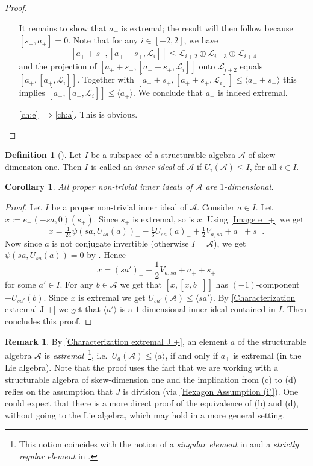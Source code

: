 \documentclass[oneside,a4paper]{amsart} %
\newtheorem{corollary}[theorem]{Corollary}
\theoremstyle{definition}
\newtheorem{remark}[theorem]{Remark}
\newtheorem{definition}[theorem]{Definition}
\newcommand{\A}{\mathcal{A}}
\newcommand{\LL}{\mathcal{L}}
\numberwithin{equation}{section}
\begin{document}
\begin{proof}
\begin{itemize}
    	It remains to show that $a_+$ is extremal; the result will then follow because $[s_+,a_+]=0$.
    	Note that for any $i \in [-2, 2]$, we have
    	\[ [a_++s_+,[a_++s_+,\LL_i]]\leq \LL_{i+2}\oplus \LL_{i+3}\oplus \LL_{i+4} \]
    	and the projection of $[a_++s_+,[a_++s_+,\LL_i]]$ onto  $\LL_{i+2}$ equals $[a_+,[a_+,\LL_i]]$. 
    	Together with $[a_++s_+,[a_++s_+,\LL_i]]\leq \langle a_++s_+\rangle$ this implies $[a_+,[a_+,\LL_i]]\leq \langle a_+\rangle$. 
    	We conclude that $a_+$ is indeed extremal.
    	
	\item[\cref{ch:e}$\implies$\cref{ch:a}.]
    	This is obvious.
	\qedhere
	\end{itemize}
\end{proof}

\begin{definition}[{\cite[Definition 6.1]{Garibaldi2001}}]
	Let $I$ be a subspace of a structurable algebra $\A$ of skew-dimension one. Then $I$ is called an \emph{inner ideal} of $\A$ if $U_i(\A)\leq I$, for all $i\in I$.
\end{definition}

\begin{corollary}
\label{Inner ideal skew one}
	All proper non-trivial inner ideals of $\A$ are $1$-dimensional. 
\end{corollary}
\begin{proof}
	Let $I$ be a proper non-trivial inner ideal of $\A$.
	Consider $a\in I$.
	Let $x:=e_-(-sa,0)(s_+)$.
    Since $s_+$ is extremal, so is $x$.
    Using \cref{Image e_+} we get
    	\[ x = \tfrac{1}{24} \psi(sa, U_{sa}(a))_--\tfrac 1 6 U_{sa}(a)_-+\tfrac 1 2 V_{a,sa}+a_++s_+ . \]
    Now since $a$ is not conjugate invertible (otherwise $I=\A$), we get $\psi(sa, U_{sa}(a))=0$ by \cite[Theorem 2.11]{Allison1984}.
    Hence
    	\[ x=(sa')_-+\frac{1}{2}V_{a,sa}+a_++s_+ \]
    for some $a'\in I$.
	For any $b\in \A$ we get that $[x,[x,b_+]]$ has $(-1)$-component $-U_{sa'}(b)$.
	Since $x$ is extremal we get $U_{sa'}(\A)\leq \langle sa'\rangle $.
	By \cref{Characterization extremal J +} we get that $\langle a'\rangle$ is a $1$-dimensional inner ideal contained in $I$.
	Then \cite[Theorem 6.12]{Garibaldi2001} concludes this proof.
\end{proof}


\begin{remark}
	By \cref{Characterization extremal J +}, an element $a$ of the structurable algebra $\A$ is \emph{extremal}%
	\,\footnote{This notion coincides with the notion of a \textit{singular element} in \cite[Definition 5.1]{Garibaldi2001} and a \emph{strictly regular element} in \cite[p. 196]{Allison1984}.},
	i.e.\@~$U_a(\A)\leq\langle a\rangle$, if and only if $a_+$ is extremal (in the Lie algebra).
	Note that the proof uses the fact that we are working with a structurable algebra of skew-dimension one and the implication from (c) to (d) relies on the assumption that $J$ is division (via \cref{Hexagon Assumption (i)}). 
	One could expect that there is a more direct proof of the equivalence of (b) and (d), without going to the Lie algebra, which may hold in a more general setting.
\end{remark}
\end{document}
